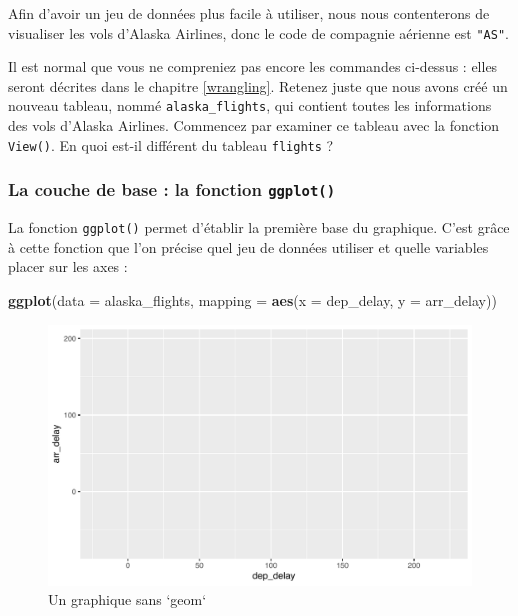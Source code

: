 \documentclass[a4paperpaper,]{article}
\newenvironment{Shaded}{\begin{snugshade}}{\end{snugshade}}
\newcommand{\DataTypeTok}[1]{\textcolor[rgb]{0.00,0.34,0.68}{#1}}
\newcommand{\KeywordTok}[1]{\textcolor[rgb]{0.12,0.11,0.11}{\textbf{#1}}}
\newcommand{\NormalTok}[1]{\textcolor[rgb]{0.12,0.11,0.11}{#1}}
\newcommand{\OperatorTok}[1]{\textcolor[rgb]{0.12,0.11,0.11}{#1}}
\newcommand{\StringTok}[1]{\textcolor[rgb]{0.75,0.01,0.01}{#1}}
\theoremstyle{definition}
\theoremstyle{definition}
\theoremstyle{definition}
\theoremstyle{remark}
\begin{document}
Afin d'avoir un jeu de données plus facile à utiliser, nous nous
contenterons de visualiser les vols d'Alaska Airlines, donc le code de
compagnie aérienne est \texttt{"AS"}.

\begin{Shaded}
\end{Shaded}

Il est normal que vous ne compreniez pas encore les commandes ci-dessus
: elles seront décrites dans le chapitre \ref{wrangling}. Retenez juste
que nous avons créé un nouveau tableau, nommé \texttt{alaska\_flights},
qui contient toutes les informations des vols d'Alaska Airlines.
Commencez par examiner ce tableau avec la fonction \texttt{View()}. En
quoi est-il différent du tableau \texttt{flights} ?

\hypertarget{la-couche-de-base-la-fonction-ggplot}{%
\subsubsection{\texorpdfstring{La couche de base : la fonction
\texttt{ggplot()}}{La couche de base : la fonction ggplot()}}\label{la-couche-de-base-la-fonction-ggplot}}

La fonction \texttt{ggplot()} permet d'établir la première base du
graphique. C'est grâce à cette fonction que l'on précise quel jeu de
données utiliser et quelle variables placer sur les axes :

\begin{Shaded}
\begin{Highlighting}[]
\KeywordTok{ggplot}\NormalTok{(}\DataTypeTok{data =}\NormalTok{ alaska_flights, }\DataTypeTok{mapping =} \KeywordTok{aes}\NormalTok{(}\DataTypeTok{x =}\NormalTok{ dep_delay, }\DataTypeTok{y =}\NormalTok{ arr_delay))}
\end{Highlighting}
\end{Shaded}

\begin{figure}[htpb]

{\centering \includegraphics[width=0.9\linewidth]{figure/unnamed-chunk-37-1} 

}

\caption{Un graphique sans `geom`}\label{fig:unnamed-chunk-37}
\end{figure}
\end{document}
